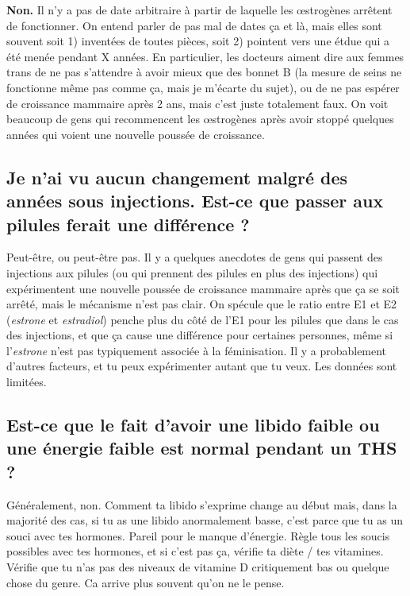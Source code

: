 \documentclass{article}
\begin{document}
\textbf{Non.} Il n'y a pas de date arbitraire à partir de laquelle les œstrogènes arrêtent de fonctionner. On entend parler de pas mal de dates ça et là, mais elles sont souvent soit 1) inventées de toutes pièces, soit 2) pointent vers une étdue qui a été menée pendant X années. En particulier, les docteurs aiment dire aux femmes trans de ne pas s'attendre à avoir mieux que des bonnet B (la mesure de seins ne fonctionne même pas comme ça, mais je m'écarte du sujet), ou de ne pas espérer de croissance mammaire après 2 ans, mais c'est juste totalement faux. On voit beaucoup de gens qui recommencent les œstrogènes après avoir stoppé quelques années qui voient une nouvelle poussée de croissance. 

\subsection{Je n'ai vu aucun changement malgré des années sous injections. Est-ce que passer aux pilules ferait une différence ?}

Peut-être, ou peut-être pas. Il y a quelques anecdotes de gens qui passent des injections aux pilules (ou qui prennent des pilules en plus des injections) qui expérimentent une nouvelle poussée de croissance mammaire après que ça se soit arrêté, mais le mécanisme n'est pas clair. On spécule que le ratio entre E1 et E2 (\textit{estrone} et \textit{estradiol}) penche plus du côté de l'E1 pour les pilules que dans le cas des injections, et que ça cause une différence pour certaines personnes, même si l'\textit{estrone} n'est pas typiquement associée à la féminisation. Il y a probablement d'autres facteurs, et tu peux expérimenter autant que tu veux. Les données sont limitées. 

\subsection{Est-ce que le fait d'avoir une libido faible ou une énergie faible est normal pendant un THS ?}

Généralement, non. Comment ta libido s'exprime change au début mais, dans la majorité des cas, si tu as une libido anormalement basse, c'est parce que tu as un souci avec tes hormones. Pareil pour le manque d'énergie. Règle tous les soucis possibles avec tes hormones, et si c'est pas ça, vérifie ta diète / tes vitamines. Vérifie que tu n'as pas des niveaux de vitamine D critiquement bas ou quelque chose du genre. Ca arrive plus souvent qu'on ne le pense.
\end{document}

